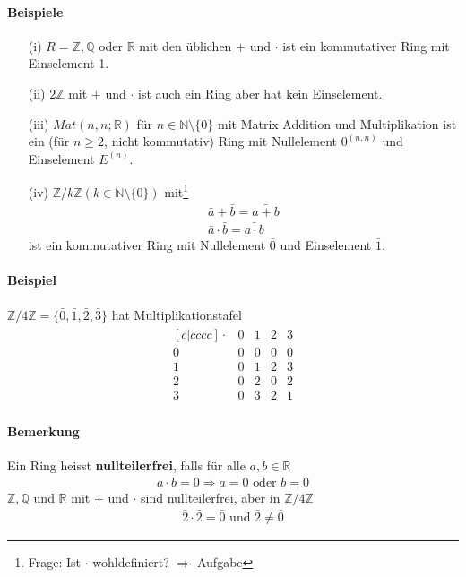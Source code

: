 \documentclass[11pt]{report}
\newcommand*\Zb[1] {\mathbb{#1}}
\newcommand*\f[1] {\textbf{#1}}
\begin{document}
\paragraph{Beispiele}
\begin{itemize}
 \item[(i)] $R=\Zb{Z}, \Zb{Q}$ oder $\Zb{R}$ mit den üblichen $+$ und $\cdot$ ist ein kommutativer Ring mit Einselement 1.
 \item[(ii)] $2\Zb{Z}$ mit $+$ und $\cdot$ ist auch ein Ring aber hat kein Einselement.
 \item[(iii)] $Mat(n, n; \Zb{R})$ für $n \in \Zb{N}\setminus\{0\}$ mit Matrix Addition und Multiplikation ist ein (für $n \ge 2$, nicht kommutativ) Ring mit Nullelement $0^{(n, n)}$ und Einselement $E^{(n)}$.
 \item[(iv)] $\Zb{Z} / k\Zb{Z} (k \in \Zb{N} \setminus \{0\})$ mit\footnote{Frage: Ist $\cdot$ wohldefiniert? $\Rightarrow$ Aufgabe} 
\begin{align}
 \bar{a} + \bar{b} = \bar{a + b} \\
 \bar{a} \cdot \bar{b} = \bar{a \cdot b}
\end{align}
ist ein kommutativer Ring mit Nullelement $\bar{0}$ und Einselement $\bar{1}$.
\end{itemize}

\paragraph{Beispiel}
$\Zb{Z} / 4\Zb{Z} = \{\bar{0}, \bar{1}, \bar{2}, \bar{3}\}$ hat Multiplikationstafel
\begin{align}
 \begin{matrix}[c|cccc]
 \cdot & 0 & 1 & 2 & 3 \\
\hline
0 & 0 & 0 & 0 & 0\\
1 & 0 & 1 & 2 & 3\\
2 & 0 & 2 & 0 & 2 \\
3 & 0 & 3 & 2 & 1
\end{matrix}
\end{align}

\paragraph{Bemerkung}
Ein Ring heisst \f{nullteilerfrei}, falls für alle $a, b \in \Zb{R}$
\begin{align}
a \cdot b = 0 \Rightarrow a = 0 \textrm{ oder } b=0
\end{align}
$\Zb{Z}, \Zb{Q}$ und $\Zb{R}$ mit $+$ und $\cdot$ sind nullteilerfrei, aber in $\Zb{Z} / 4\Zb{Z}$
\begin{align}
 \bar{2}\cdot \bar{2} = \bar{0} \textrm{ und } \bar{2}\neq\bar{0}
\end{align}
\end{document}
